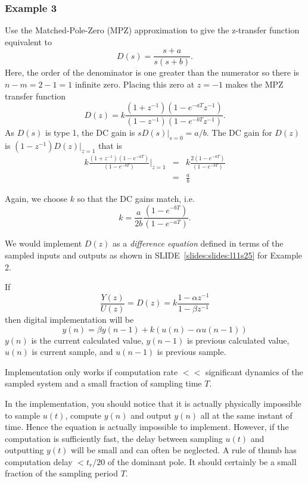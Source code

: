 \subsubsection*{Example 3}

Use the Matched-Pole-Zero (MPZ) approximation to give the z-transfer function equivalent to
$$D(s)=\frac{s+a}{s(s+b)}.$$ Here, the order of the denominator is one greater than the numerator so there is $n-m = 2 - 1 = 1$ infinite zero. Placing this zero at $z = -1$ makes the MPZ transfer function $$D(z)=k\frac{(1+z^{-1})(1-e^{-aT}z^{-1})}{(1-z^{-1})(1 - e^{-bT}z^{-1})}.$$ As $D(s)$ is type 1, the DC gain is $sD(s)|_{s=0} = a/b$. The DC gain for $D(z)$ is $(1-z^{-1})D(z)|_{z=1}$ that is 
\begin{eqnarray*}
k\frac{(1+z^{-1})(1-e^{-aT})}{(1-e^{-bT})}|_{z=1} & = & k\frac{2(1-e^{-aT})}{(1-e^{-bT})} \\
        & = & \frac{a}{b} 
\end{eqnarray*}

Again, we choose $k$ so that the DC gains match, i.e. $$k = \frac{a}{2b}\frac{(1-e^{-bT})}{(1-e^{-aT})}.$$

We would implement $D(z)$ as a \emph{difference equation} defined in terms of the sampled inputs and outputs as shown in SLIDE~\ref{slides:slides:l11s25} for Example 2.
\begin{slide}\label{slides:l11s25}
	If $$\frac{Y(z)}{U(z)}=D(z)=k\frac{1-\alpha z^{-1}}{1-\beta z^{-1}}$$ then digital implementation will be
	$$y(n)=\beta y(n-1)+k(u(n)-\alpha u(n-1))$$
	$y(n)$ is the current calculated value, $y(n-1)$ is previous calculated value, $u(n)$ is current sample, and $u(n-1)$ is previous sample.
	
	Implementation only works if computation rate $<<$ significant dynamics of the sampled system and a small fraction of sampling time $T$.
\end{slide}

In the implementation, you should notice that it is actually physically impossible to sample $u(t)$, compute $y(n)$ and output $y(n)$ all at the same instant of time. Hence the equation is actually impossible to implement. However, if the computation is sufficiently fast, the delay between sampling $u(t)$ and outputting $y(t)$ will be small and can often be neglected.  A rule of thumb has computation delay $< t_r/20$ of the dominant pole. It should certainly be a small fraction of the sampling period $T$. 

